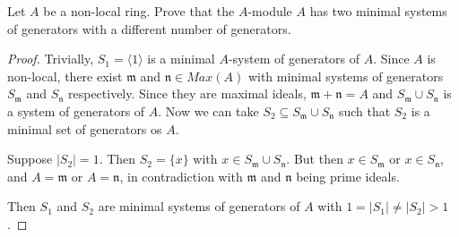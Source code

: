 \begin{problem}
    Let $A$ be a non-local ring.
    Prove that the $A$-module $A$ has two minimal systems of generators with a different number of generators.
    \begin{sol}
        \begin{proof}
            Trivially, $S_1 = \langle1\rangle$ is a minimal $A$-system of generators of $A$.
            Since $A$ is non-local, there exist $\mathfrak{m}$ and $\mathfrak{n} \in Max(A)$ with minimal systems of
            generators $S_\mathfrak{m}$ and $S_\mathfrak{n}$ respectively.
            Since they are maximal ideals, $\mathfrak{m} + \mathfrak{n} = A$ and $S_\mathfrak{m} \cup S_\mathfrak{n}$ is a
            system of generators of $A$.
            Now we can take $S_2 \subseteq S_\mathfrak{m} \cup S_\mathfrak{n}$ such that $S_2$ is a minimal set of
            generators os $A$.

            Suppose $|S_2| = 1$.
            Then $S_2 = \{x\}$ with $x \in S_\mathfrak{m} \cup S_\mathfrak{n}$.
            But then $x \in S_\mathfrak{m}$ or $x \in S_\mathfrak{n}$, and $A = \mathfrak{m}$ or $A = \mathfrak{n}$, in
            contradiction with $\mathfrak{m}$ and $\mathfrak{n}$ being prime ideals.

            Then $S_1$ and $S_2$ are minimal systems of generators of $A$ with $1 = |S_1| \neq |S_2| > 1$.
        \end{proof}
    \end{sol}
\end{problem}